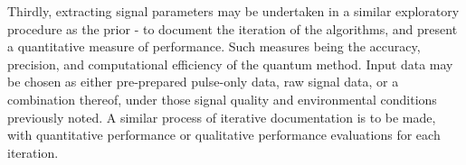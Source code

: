 Thirdly, extracting signal parameters may be undertaken in a similar exploratory procedure as the prior - to document the iteration of the algorithms, and present a quantitative measure of performance. Such measures being the accuracy, precision, and computational efficiency of the quantum method. Input data may be chosen as either pre-prepared pulse-only data, raw signal data, or a combination thereof, under those signal quality and environmental conditions previously noted. A similar process of iterative documentation is to be made, with quantitative performance or qualitative performance evaluations for each iteration.









